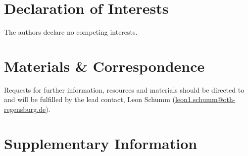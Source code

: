\documentclass[5p,numafflabel]{elsarticle}
\begin{document}
\section*{Declaration of Interests}

The authors declare no competing interests.


\section*{Materials \& Correspondence}

Requests for further information, resources and materials should be directed to and will be fulfilled by the lead contact, Leon Schumm
(\href{mailto:leon1.schumm@oth-regensburg.de}{leon1.schumm@oth-regensburg.de}).




\newpage
\onecolumn

\makeatletter
\renewcommand \thesection{S\@arabic\c@section}
\renewcommand\thetable{S\@arabic\c@table}
\renewcommand \thefigure{S\@arabic\c@figure}
\makeatother
\renewcommand{\citenumfont}[1]{S#1}
\setcounter{equation}{0}
\setcounter{figure}{0}
\setcounter{table}{0}
\setcounter{section}{0}


\section*{Supplementary Information}
\label{sec:si}














\renewcommand{\ttdefault}{\sfdefault}

\end{document}
